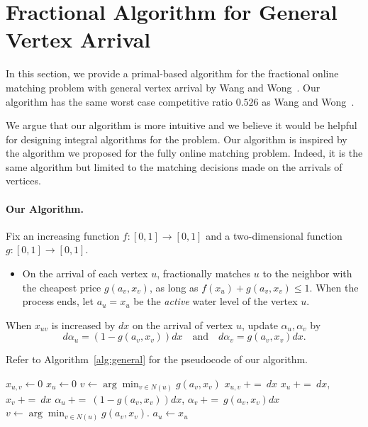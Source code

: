 \section{Fractional Algorithm for General Vertex Arrival}
\label{sec:general_lower}

In this section, we provide a primal-based algorithm for the fractional online matching problem with general vertex arrival by Wang and Wong~\cite{icalp/WangW15}. Our algorithm has the same worst case competitive ratio $0.526$ as Wang and Wong~\cite{icalp/WangW15}. 

We argue that our algorithm is more intuitive and we believe it would be helpful for designing integral algorithms for the problem. Our algorithm is inspired by the algorithm we proposed for the fully online matching problem. Indeed, it is the same algorithm but limited to the matching decisions made on the arrivals of vertices.
\paragraph{Our Algorithm.}
Fix an increasing function $f:[0,1] \to [0,1]$ and a two-dimensional function $g:[0,1] \to [0,1]$.
\begin{itemize}
	\item On the arrival of each vertex $u$, fractionally matches $u$ to the neighbor with the cheapest price $g(a_v, x_v)$, as long as $f(x_u) + g(a_v,x_v) \le 1$. When the process ends, let $a_u = x_u$ be the \emph{active} water level of the vertex $u$.
\end{itemize}
When $x_{uv}$ is increased by $dx$ on the arrival of vertex $u$, update $\alpha_u, \alpha_v$ by
\[
d\alpha_u = (1-g(a_v, x_v)) dx \quad \text{and} \quad d\alpha_v =g(a_v, x_v) dx.
\]

Refer to Algorithm~\ref{alg:general} for the pseudocode of our algorithm.

\begin{algorithm}[H]
	\caption{History-based Pricing Algorithm for General Vertex Arrival}\label{alg:general}
	\begin{algorithmic}
		 
		\State $x_{u,v} \gets 0$ 
		\EndFor
		\State $x_{u} \gets 0$ 
		\State $v \gets \arg\min_{v\in N(u)}g(a_v,x_{v})$
			\State $x_{u,v}  ~{\scriptstyle  \mathrel{+}=}~ dx$ 
			\State $x_{u} ~{\scriptstyle  \mathrel{+}=}~ dx$, $x_{v}  ~{\scriptstyle  \mathrel{+}=}~ dx$ 
			\State $\alpha_u   ~{\scriptstyle  \mathrel{+}=}~ (1 - g(a_{v},x_{v}))dx$,  $\alpha_{v}  ~{\scriptstyle  \mathrel{+}=}~ g(a_{v},x_{v})dx$ 
			\State $v \gets \arg\min_{v\in N(u)}g(a_v,x_{v})$.
		\EndWhile
		\State $a_u \gets x_u$ 
	\EndIf
	\end{algorithmic}
\end{algorithm}

